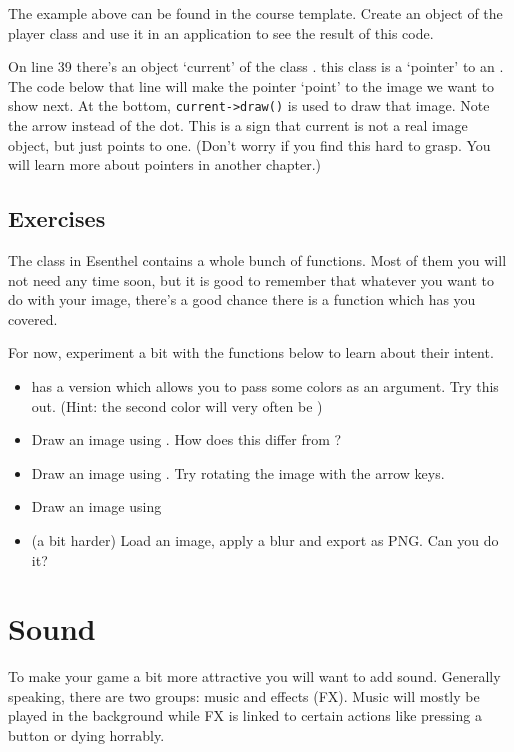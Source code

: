 \begin{exercise}
The example above can be found in the course template. Create an object of the player class and use it in an application to see the result of this code.
\end{exercise}

\begin{note}
On line 39 there's an object `current' of the class . this class is a `pointer' to an . The code below that line will make the pointer `point' to the image we want to show next. At the bottom, \verb|current->draw()| is used to draw that image. Note the arrow instead of the dot. This is a sign that current is not a real image object, but just points to one. (Don't worry if you find this hard to grasp. You will learn more about pointers in another chapter.)
\end{note}

\subsection{Exercises}
The  class in Esenthel contains a whole bunch of functions. Most of them you will not need any time soon, but it is good to remember that whatever you want to do with your image, there's a good chance there is a function which has you covered.

For now, experiment a bit with the functions below to learn about their intent.

\begin{itemize}
\item {} has a version which allows you to pass some colors as an argument. Try this out. (Hint: the second color will very often be )
\item Draw an image using . How does this differ from ?
\item Draw an image using . Try rotating the image with the arrow keys.
\item Draw an image using 
\item (a bit harder) Load an image, apply a blur and export as PNG. Can you do it?
\end{itemize}

\section{Sound}
To make your game a bit more attractive you will want to add sound. Generally speaking, there are two groups: music and effects (FX). Music will mostly be played in the background while FX is linked to certain actions like pressing a button or dying horrably.

